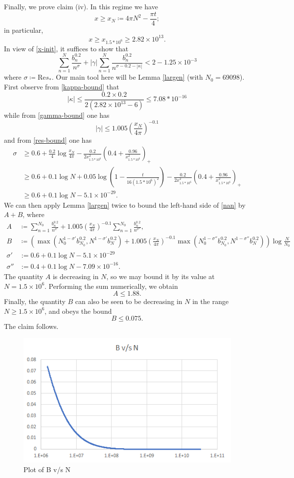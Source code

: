Finally, we prove claim (iv).  In this regime we have
$$ x \geq x_N \coloneqq 4\pi N^2 - \frac{\pi t}{4};$$
in particular,
$$ x \geq x_{1.5*10^6} \geq  2.82 \times 10^{13}.$$
In view of \eqref{x-init}, it suffices to show that
\begin{equation}\label{nan}
 \sum_{n=1}^N \frac{b_n^{0.2}}{n^\sigma} + |\gamma| \sum_{n=1}^N \frac{b_n^{0.2}}{n^{\sigma-0.2-|\kappa|}}
< 2 - 1.25 \times 10^{-3}
\end{equation}
where $\sigma \coloneqq \mathrm{Re} s_*$.
Our main tool here will be Lemma \ref{largen} (with $N_0 = 69098$).  First observe from \eqref{kappa-bound} that
$$ |\kappa| \leq \frac{0.2 \times 0.2}{2(2.82 \times 10^{13}-6)} \leq 7.08 * 10^{-16}$$
while from \eqref{gamma-bound} one has
$$
|\gamma| \leq 1.005 \left( \frac{x_N}{4\pi} \right)^{-0.1}$$
and from \eqref{res-bound} one has
\begin{align*}
\sigma &\geq 0.6 + \frac{0.2}{4} \log \frac{x_N}{4\pi} - \frac{0.2}{2x_{1.5*10^6}^2} (0.4+\frac{0.96}{x_{1.5*10^6}^2})_+ \\
&\geq 0.6 + 0.1 \log N + 0.05 \log (1 - \frac{t}{16 (1.5*10^6)^2}) - \frac{0.2}{2x_{1.5*10^6}^2} (0.4+\frac{0.96}{x_{1.5*10^6}^2})_+ \\
&\geq 0.6 + 0.1 \log N - 5.1 \times 10^{-29}.
\end{align*}
We can then apply Lemma \ref{largen} twice to bound the left-hand side of \eqref{nan} by $A+B$, where
\begin{align*}
A &\coloneqq \sum_{n=1}^{N_0} \frac{b_n^{0.2}}{n^{\sigma'}} + 1.005 \left( \frac{x_N}{4\pi} \right)^{-0.1} \sum_{n=1}^{N_0} \frac{b_n^{0.2}}{n^{\sigma''}}, \\
B &\coloneqq (\max( N_0^{1-\sigma'} b_{N_0}^{0.2}, N^{1-\sigma'} b_N^{0.2} ) + 1.005 \left( \frac{x_N}{4\pi} \right)^{-0.1} 
\max( N_0^{1-\sigma''} b_{N_0}^{0.2}, N^{1-\sigma''} b_N^{0.2} ) )\log \frac{N}{N_0} \\
\sigma' &:= 0.6 + 0.1 \log N - 5.1 \times 10^{-29} \\
\sigma'' &:= 0.4 + 0.1 \log N - 7.09 \times 10^{-16}.
\end{align*}
The quantity $A$ is decreasing in $N$, so we may bound it by its value at $N = 1.5 \times 10^6$.  Performing the sum numerically, we obtain
$$ A \leq 1.88.$$
Finally, the quantity $B$ can also be seen to be decreasing in $N$ in the range $N \geq 1.5 \times 10^6$, and obeys the bound
$$ B \leq 0.075.$$
The claim follows.

\begin{figure}
  \includegraphics[width=0.6\linewidth]{B_vs_N.png}
  \caption{Plot of B v/s N}
  \label{fig:boat1}
\end{figure}

